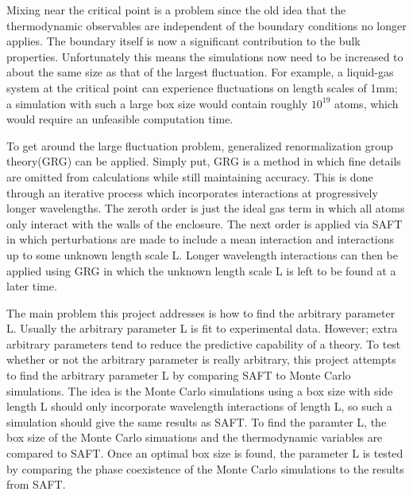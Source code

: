 Mixing near the critical point is a problem since the old idea that the thermodynamic observables are independent of the boundary conditions no longer applies. The boundary itself is now a significant contribution to the bulk properties. Unfortunately this means the simulations now need to be increased to about the same size as that of the largest fluctuation. For example, a liquid-gas system at the critical point can experience fluctuations on length scales of 1mm; a simulation with such a large box size would contain roughly $10^{19}$ atoms, which would require an unfeasible computation time.

To get around the large fluctuation problem, generalized renormalization group theory(GRG) can be applied. Simply put, GRG is a method in which fine details are omitted from calculations while still maintaining accuracy. This is done through an iterative process which incorporates interactions at progressively longer wavelengths. The zeroth order is just the ideal gas term in which all atoms only interact with the walls of the enclosure. The next order is applied via SAFT in which perturbations are made to include a mean interaction and interactions up to some unknown length scale L. Longer wavelength interactions can then be applied using GRG in which the unknown length scale L is left to be found at a later time.

The main problem this project addresses is how to find the arbitrary parameter L. Usually the arbitrary parameter L is fit to experimental data. However; extra arbitrary parameters tend to reduce the predictive capability of a theory. To test whether or not the arbitrary parameter is really arbitrary, this project attempts to find the arbitrary parameter L by comparing SAFT to Monte Carlo simulations. The idea is the Monte Carlo simulations using a box size with side length L should only incorporate wavelength interactions of length L, so such a simulation should give the same results as SAFT. To find the paramter L, the box size of the Monte Carlo simuations and the thermodynamic variables are compared to SAFT. Once an optimal box size is found, the parameter L is tested by comparing the phase coexistence of the Monte Carlo simulations to the results from SAFT.